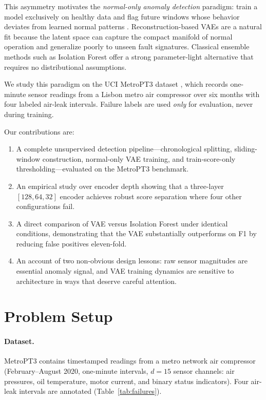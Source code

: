 \documentclass{article}
\begin{document}
This asymmetry motivates the \emph{normal-only anomaly detection} paradigm:
train a model exclusively on healthy data and flag future windows whose behavior
deviates from learned normal patterns \citep{sakurada2014anomaly,an2015variational}.
Reconstruction-based VAEs are a natural fit because the latent space can capture the
compact manifold of normal operation and generalize poorly to unseen fault signatures.
Classical ensemble methods such as Isolation Forest \citep{liu2008isolation} offer a
strong parameter-light alternative that requires no distributional assumptions.

We study this paradigm on the UCI MetroPT3 dataset \citep{veloso2022metropt},
which records one-minute sensor readings from a Lisbon metro air compressor over
six months with four labeled air-leak intervals.
Failure labels are used \emph{only} for evaluation, never during training.

\smallskip
\newpage
\noindent Our contributions are:
\begin{enumerate}
  \item A complete unsupervised detection pipeline---chronological splitting,
        sliding-window construction, normal-only VAE training, and train-score-only
        thresholding---evaluated on the MetroPT3 benchmark.
  \item An empirical study over encoder depth showing that a three-layer
        $[128, 64, 32]$ encoder achieves robust score separation where four other
        configurations fail.
  \item A direct comparison of VAE versus Isolation Forest under identical conditions,
        demonstrating that the VAE substantially outperforms on F1 by reducing false
        positives eleven-fold.
  \item An account of two non-obvious design lessons: raw sensor magnitudes are
        essential anomaly signal, and VAE training dynamics are sensitive to architecture
        in ways that deserve careful attention.
\end{enumerate}


\section{Problem Setup}

\paragraph{Dataset.}
MetroPT3 \citep{veloso2022metropt} contains timestamped readings from a metro network
air compressor (February--August 2020, one-minute intervals, $d = 15$ sensor channels:
air pressures, oil temperature, motor current, and binary status indicators).
Four air-leak intervals are annotated (Table~\ref{tab:failures}).
\end{document}
